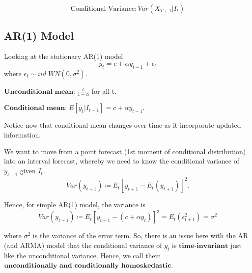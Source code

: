 \documentclass[twoside]{article}
\begin{document}
$$
\text{Conditional Variance}: Var(X_{T+1}|I_t)
$$

\subsection{AR(1) Model}

Looking at the stationary AR(1) model
$$
y_t = c + \alpha y_{t-1} + \epsilon_t
$$
where $\epsilon_t \sim iid \; WN(0, \sigma^2)$.

$\textbf{Unconditional mean:} \; \frac{c}{1 - \alpha}$ for all t.

$\textbf{Conditional mean:} \; E[y_t|I_{t-1}] = c + \alpha y_{t-1}$.

Notice now that conditional mean changes over time as it incorporate updated information. 

We want to move from a point forecast (1st moment of conditional distribution) into an interval forecast, whereby we need to know the conditional variance of $y_{t+1}$ given $I_t$.
$$
Var(y_{t+1}) \coloneqq E_t[y_{t+1} - E_t(y_{t+1})]^2.
$$

Hence, for simple AR(1) model, the variance is
$$
Var(y_{t+1}) \coloneqq E_t[y_{t+1} - (c + \alpha y_{t})]^2 = E_t(\epsilon_{t+1}^2) = \sigma^2
$$

where $\sigma^2$ is the variance of the error term. So, there is an issue here with the AR (and ARMA) model that the conditional variance of $y_t$ is $\textbf{time-invariant}$ just like the unconditional variance. Hence, we call them $\textbf{unconditionally and conditionally homoskedastic}$.
\end{document}
